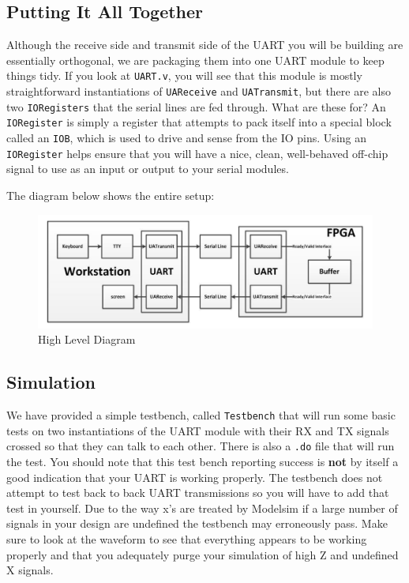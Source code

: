 \documentclass[11pt]{article}
\begin{document}
\subsection{Putting It All Together}
Although the receive side and transmit side of the UART you will be building are essentially orthogonal, we are packaging them into one UART module to keep things tidy. If you look at \verb|UART.v|, you will see that this module is mostly straightforward instantiations of \verb|UAReceive| and \verb|UATransmit|, but there are also two \verb|IORegisters| that the serial lines are fed through. What are these for? An \verb|IORegister| is simply a register that attempts to pack itself into a special block called an \verb|IOB|, which is used to drive and sense from the IO pins. Using an \verb|IORegister| helps ensure that you will have a nice, clean, well-behaved off-chip signal to use as an input or output to your serial modules.

The diagram below shows the entire setup:
\begin{figure}[H]
\centering
\includegraphics[width=6in]{images/high_level_diagram.png}
\caption{High Level Diagram}
\end{figure}

\subsection{Simulation}
We have provided a simple testbench, called \verb|Testbench| that will run some basic tests on two instantiations of the UART module with their RX and TX signals crossed so that they can talk to each other. There is also a \verb|.do| file that will run the test. You should note that this test bench reporting success is \textbf{not} by itself a good indication that your UART is working properly. The testbench does not attempt to test back to back UART transmissions so you will have to add that test in yourself. Due to the way x's are treated by Modelsim if a large number of signals in your design are undefined the testbench may erroneously pass. Make sure to look at the waveform to see that everything appears to be working properly and that you adequately purge your simulation of high Z and undefined X signals.
\end{document}
